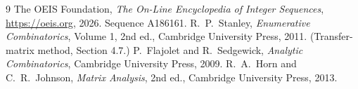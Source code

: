 \documentclass[11pt,a4paper]{article}
\theoremstyle{plain}
\theoremstyle{definition}
\begin{document}
\begin{thebibliography}{9}
 The OEIS Foundation, \emph{The On-Line Encyclopedia of Integer
Sequences}, \url{https://oeis.org}, 2026. Sequence A186161.
 R.~P.~Stanley, \emph{Enumerative Combinatorics}, Volume 1, 2nd ed.,
Cambridge University Press, 2011. (Transfer-matrix method, Section 4.7.)
 P.~Flajolet and R.~Sedgewick, \emph{Analytic Combinatorics}, Cambridge
University Press, 2009.
 R.~A.~Horn and C.~R.~Johnson, \emph{Matrix Analysis}, 2nd ed., Cambridge
University Press, 2013.
\end{thebibliography}
\end{document}
